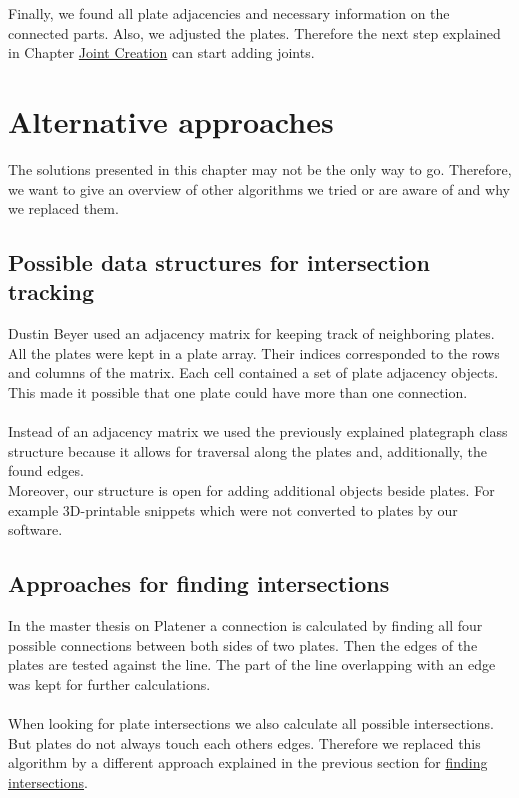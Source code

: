 \documentclass[../ClassicThesis.tex]{subfiles}
\begin{document}
Finally, we found all plate adjacencies and necessary information on the connected parts. Also, we adjusted the plates. Therefore the next step explained in Chapter \hyperref[ch:joints]{Joint Creation} can start adding joints.

\section{Alternative approaches}
The solutions presented in this chapter may not be the only way to go. Therefore, we want to give an overview of other algorithms we tried or are aware of and why we replaced them.

\subsection{Possible data structures for intersection tracking}
Dustin Beyer used an adjacency matrix for keeping track of neighboring plates. All the plates were kept in a plate array. Their indices corresponded to the rows and columns of the matrix. Each cell contained a set of plate adjacency objects. This made it possible that one plate could have more than one connection.\\
\*\\
Instead of an adjacency matrix we used the previously explained plategraph class structure because it allows for traversal along the plates and, additionally, the found edges. \\
Moreover, our structure is open for adding additional objects beside plates. For example 3D-printable snippets which were not converted to plates by our software.

\subsection{Approaches for finding intersections}
In the master thesis on Platener a connection is calculated by finding all four possible connections between both sides of two plates. Then the edges of the plates are tested against the line. The part of the line overlapping with an edge was kept for further calculations.\\
\*\\
When looking for plate intersections we also calculate all possible intersections. But plates do not always touch each others edges. Therefore we replaced this algorithm by a different approach explained in the previous section for \hyperref[findIntersections]{finding intersections}.
\end{document}

